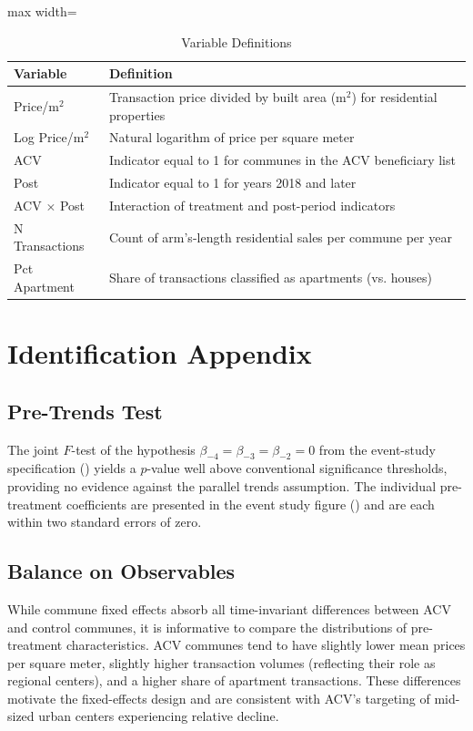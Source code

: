 \documentclass[12pt]{article}
\begin{document}
\begin{table}[H]
\centering
\caption{Variable Definitions}
\begin{adjustbox}{max width=\textwidth}
\begin{tabular}{lp{10cm}}
\toprule
Variable & Definition \\
\midrule
Price/m$^2$ & Transaction price divided by built area (m$^2$) for residential properties \\
Log Price/m$^2$ & Natural logarithm of price per square meter \\
ACV & Indicator equal to 1 for communes in the ACV beneficiary list \\
Post & Indicator equal to 1 for years 2018 and later \\
ACV $\times$ Post & Interaction of treatment and post-period indicators \\
N Transactions & Count of arm's-length residential sales per commune per year \\
Pct Apartment & Share of transactions classified as apartments (vs. houses) \\
\bottomrule
\end{tabular}
\end{adjustbox}
\end{table}


\section{Identification Appendix}

\subsection{Pre-Trends Test}

The joint $F$-test of the hypothesis $\beta_{-4} = \beta_{-3} = \beta_{-2} = 0$ from the event-study specification () yields a $p$-value well above conventional significance thresholds, providing no evidence against the parallel trends assumption. The individual pre-treatment coefficients are presented in the event study figure () and are each within two standard errors of zero.

\subsection{Balance on Observables}

While commune fixed effects absorb all time-invariant differences between ACV and control communes, it is informative to compare the distributions of pre-treatment characteristics. ACV communes tend to have slightly lower mean prices per square meter, slightly higher transaction volumes (reflecting their role as regional centers), and a higher share of apartment transactions. These differences motivate the fixed-effects design and are consistent with ACV's targeting of mid-sized urban centers experiencing relative decline.
\end{document}
